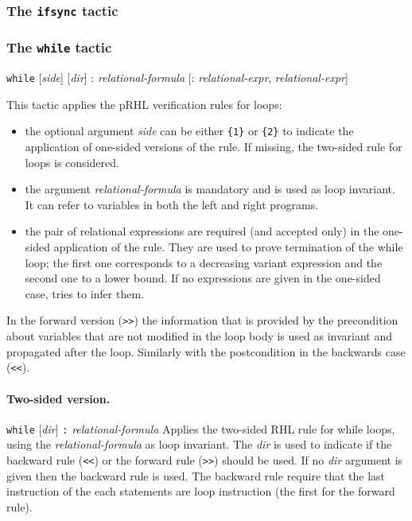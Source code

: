\subsubsection{The \texttt{ifsync} tactic}\label{tac:ifsync}

\Syntax 
\Description 
\Example

\subsubsection{The \texttt{while} tactic}\label{tac:while} \DONE


\Syntax 

\verb+while+ [\textit{side}] [\textit{dir}] 
: \textit{relational-formula} 
[: \textit{relational-expr}, \textit{relational-expr}]

\Description This tactic applies the pRHL verification rules for
loops:
\begin{itemize}
\item the optional argument \textit{side} can be either \verb+{1}+ or
  \verb+{2}+ to indicate the application of one-sided versions of the
  rule. If missing, the two-sided rule for loops is considered.
\item the argument \textit{relational-formula} is mandatory and
  is used as loop invariant. It can refer to variables in both the
  left and right programs. 
\item the pair of relational expressions are required (and accepted
  only) in the one-sided application of the rule. They are used to
  prove termination of the while loop; the first one corresponds to a
  decreasing variant expression and the second one to a lower
  bound. If no expressions are given in the one-sided case, \EasyCrypt
  tries to infer them.
\end{itemize}

In the forward version (\verb+>>+) the information that is provided by
the precondition about variables that are not modified in the loop
body is used as invariant and propagated after the loop. Similarly
with the postcondition in the backwards case (\verb+<<+).


\paragraph{Two-sided version.}
\Syntax \verb+while+ [\textit{dir}] \verb+:+ \textit{relational-formula}
\Description Applies the two-sided RHL rule for while loops, 
using the \textit{relational-formula} as loop invariant. The
\textit{dir} is used to indicate if the backward rule (\verb+<<+) or
the forward rule (\verb+>>+) should be used. If no \textit{dir} argument
is given then the backward rule is used. The backward rule require
that the last instruction of the each statements are loop instruction
(the first for the forward rule).

